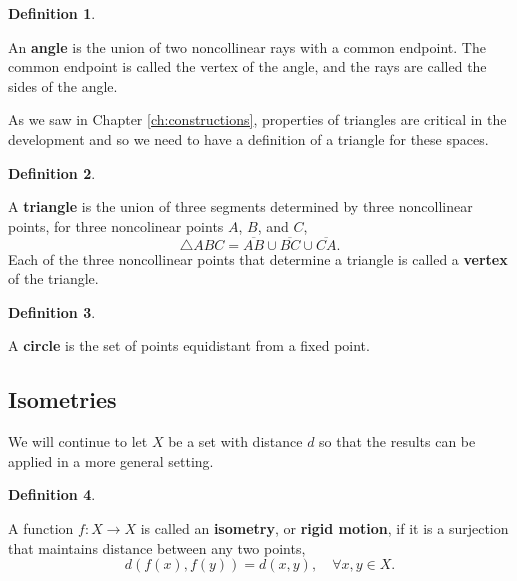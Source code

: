 \documentclass[
]{book}
\theoremstyle{definition}
\newtheorem{definition}{Definition}[chapter]
\theoremstyle{definition}
\theoremstyle{definition}
\theoremstyle{definition}
\theoremstyle{remark}
\begin{document}
\begin{definition}
\protect\hypertarget{def:unlabeled-div-237}{}\label{def:unlabeled-div-237}

An \textbf{angle} is the union of two noncollinear rays with a common endpoint. The common endpoint is called the vertex of the angle, and the rays are called the sides of the angle.

\end{definition}

As we saw in Chapter \ref{ch:constructions}, properties of triangles are critical in the development and so we need to have a definition of a triangle for these spaces.

\begin{definition}
\protect\hypertarget{def:unlabeled-div-238}{}\label{def:unlabeled-div-238}

A \textbf{triangle} is the union of three segments determined by three noncollinear points, for three noncolinear points \(A\), \(B\), and \(C\),
\[\triangle ABC = \overline{AB} \cup \overline{BC} \cup \overline {CA}.\] Each of the three noncollinear points that determine a triangle is called a \textbf{vertex} of the triangle.

\end{definition}

\begin{definition}
\protect\hypertarget{def:unlabeled-div-239}{}\label{def:unlabeled-div-239}

A \textbf{circle} is the set of points equidistant from a fixed point.

\end{definition}

\hypertarget{isometries}{%
\subsection{Isometries}\label{isometries}}

We will continue to let \(X\) be a set with distance \(d\) so that the results can be applied in a more general setting.

\begin{definition}
\protect\hypertarget{def:unlabeled-div-240}{}\label{def:unlabeled-div-240}

A function \(f:X\rightarrow X\) is called an \textbf{isometry}, or \textbf{rigid motion}, if it is a surjection that maintains distance between any two points, \[d(f(x),f(y))=d(x,y), \quad \forall x,y\in X.\]

\end{definition}
\end{document}
